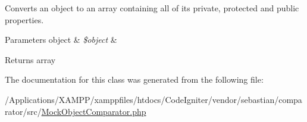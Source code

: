 Converts an object to an array containing all of its private, protected and public properties.


\begin{DoxyParams}[1]{Parameters}
object & {\em \$object} & \\
\hline
\end{DoxyParams}
\begin{DoxyReturn}{Returns}
array 
\end{DoxyReturn}


The documentation for this class was generated from the following file\+:\begin{DoxyCompactItemize}
\item 
/\+Applications/\+X\+A\+M\+P\+P/xamppfiles/htdocs/\+Code\+Igniter/vendor/sebastian/comparator/src/\mbox{\hyperlink{_mock_object_comparator_8php}{Mock\+Object\+Comparator.\+php}}\end{DoxyCompactItemize}
